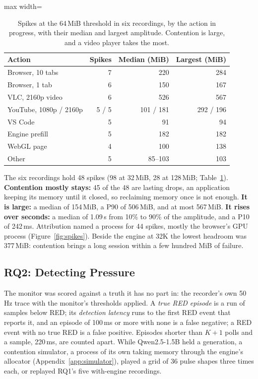 \documentclass{article}
\begin{document}
\begin{table}[t]
\caption{Spikes at the 64\,MiB threshold in six recordings, by the action in
progress, with their median and largest amplitude. Contention is large, and a
video player takes the most.}
\label{tab:rq1}
\centering
\small
\begin{adjustbox}{max width=\columnwidth}
\begin{tabular}{lrrr}
\toprule
Action & Spikes & Median (MiB) & Largest (MiB) \\
\midrule
Browser, 10 tabs & 7 & 220 & 284 \\
Browser, 1 tab & 6 & 150 & 167 \\
VLC, 2160p video & 6 & 526 & 567 \\
YouTube, 1080p / 2160p & 5 / 5 & 101 / 181 & 292 / 196 \\
VS Code & 5 & 91 & 94 \\
Engine prefill & 5 & 182 & 182 \\
WebGL page & 4 & 100 & 138 \\
Other & 5 & 85--103 & 103 \\
\bottomrule
\end{tabular}
\end{adjustbox}
\end{table}

The six recordings hold 48 spikes (98 at 32\,MiB, 28 at 128\,MiB;
Table~\ref{tab:rq1}). \textbf{Contention mostly stays:} 45 of the 48 are lasting
drops, an application keeping its memory until it closed, so reclaiming memory
once is not enough. \textbf{It is large:} a median of 154\,MiB, a P90 of
506\,MiB, and at most 567\,MiB. \textbf{It rises over seconds:} a median of
1.09\,s from 10\% to 90\% of the amplitude, and a P10 of 242\,ms. Attribution
named a process for 44 spikes, mostly the browser's GPU process
(Figure~\ref{fig:spikes}). Beside the
engine at 32K the lowest headroom was 377\,MiB: contention brings a long
session within a few hundred MiB of failure.

\subsection{RQ2: Detecting Pressure}
\label{sec:detection}

The monitor was scored against a truth it has no part in: the recorder's own
50\,Hz trace with the monitor's thresholds applied. A \textit{true RED episode}
is a run of samples below RED; its \textit{detection latency} runs to the first
RED event that reports it, and an episode of 100\,ms or more with none is a
false negative; a RED event with no true RED is a false positive. Episodes
shorter than $K+1$ polls and a sample, 220\,ms, are counted apart. While
Qwen2.5-1.5B held a generation, a contention simulator, a process of its own
taking memory through the engine's allocator (Appendix~\ref{app:simulator}),
played a grid of 36 pulse shapes three times each, or replayed RQ1's five
with-engine recordings.
\end{document}
